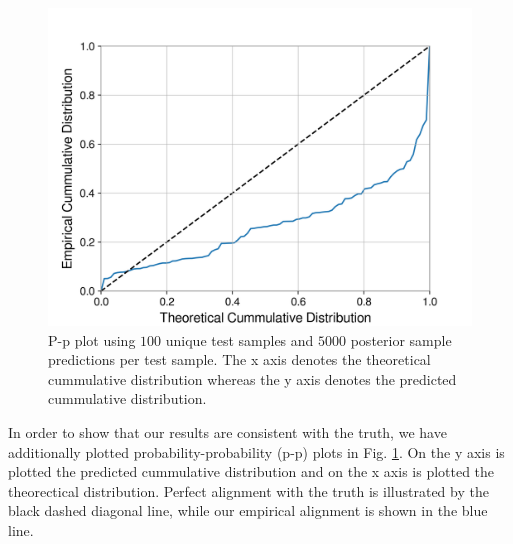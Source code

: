 \documentclass[%
showpacs,
 amsmath,amssymb,
 aps,
 twocolumn,
 prl,
 reprint,
floatfix,
]{revtex4-1}
\begin{document}
%
%
\begin{figure}
    \includegraphics[width=\columnwidth]{images/latest_pp_plot.png}
    \caption{\label{fig:pp_plot} P-p plot 
    using $100$ unique test samples and $5000$
    posterior sample predictions per test sample. 
    The x axis denotes the theoretical cummulative 
    distribution whereas the y axis denotes 
    the predicted cummulative distribution.}
\end{figure}

In order to show that our results are consistent with the 
truth, we have additionally plotted probability-probability (p-p) 
plots in Fig. \ref{fig:pp_plot}. On the y axis is plotted the predicted 
cummulative distribution and on the x axis is plotted the theorectical 
distribution. Perfect alignment with the truth is illustrated by the 
black dashed diagonal line, while our empirical alignment is 
shown in the blue line. 
\end{document}
